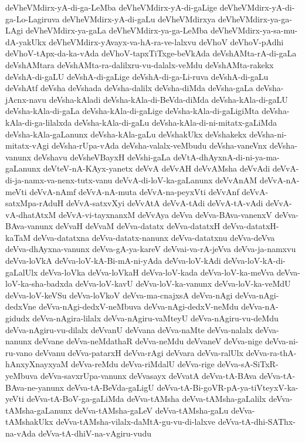 {deVheVMdirx-yA-di-ga-LeMba
deVheVMdirx-yA-di-gaLige
deVheVMdirx-yA-di-ga-Lo-Lagiruva
deVheVMdirx-yA-di-gaLu
deVheVMdirxya
deVheVMdirx-ya-ga-LAgi
deVheVMdirx-ya-gaLa
deVheVMdirx-ya-ga-LeMba
deVheVMdirx-ya-sa-mu-dA-yakUkx
deVheVMdirx-yAvayx-va-hA-ra-ve-lalxvu
deVhoV
deVhoV-pAdhi
deVhoV-tApx-da-ka-vAda
deVhoV-tapxTiTxge-beVkAda
deVshAMta-rA-di-gaLa
deVshAMtara
deVshAMta-ra-dalilxru-vu-dalalx-veMdu
deVshAMta-rakekx
deVshA-di-gaLU
deVshA-di-gaLige
deVshA-di-ga-Li-ruva
deVshA-di-gaLu
deVshAtf
deVsha
deVshada
deVsha-dalilx
deVsha-diMda
deVsha-gaLa
deVsha-jAcnx-navu
deVsha-kAladi
deVsha-kAla-di-BeVda-diMda
deVsha-kAla-di-gaLU
deVsha-kAla-di-gaLa
deVsha-kAla-di-gaLige
deVsha-kAla-di-gaLigiMta
deVsha-kAla-di-ga-lilalxda
deVsha-kAla-di-gaLu
deVsha-kAla-di-ni-mitatx-gaLiMda
deVsha-kAla-gaLanunx
deVsha-kAla-gaLu
deVshakUkx
deVshakekx
deVsha-ni-mitatx-vAgi
deVsha-rUpa-vAda
deVsha-valalx-veMbudu
deVsha-vaneVnx
deVsha-vanunx
deVshavu
deVsheVBayxH
deVshi-gaLa
deVtA-dhAyxnA-di-ni-ya-ma-gaLanunx
deVteV-nA-KAyx-yanetx
deVvA
deVvAH
deVvAMsha
deVvAdi
deVvA-di-ja-namx-va-nenx-tutx-vanu
deVvA-di-loV-ka-gaLanunx
deVvAnAM
deVvA-nA-meVti
deVvA-nAmf
deVvA-nA-muta
deVvA-na-peyxVti
deVvAnf
deVvA-satxMpa-rAduH
deVvA-satxvXyi
deVvAtA
deVvA-tAdi
deVvA-tA-vAdi
deVvA-vA-dhatAtxM
deVvA-vi-tayxnanxM
deVvAya
deVva
deVva-BAva-vanenxV
deVva-BAva-vanunx
deVvaH
deVvaM
deVva-datatx
deVva-datatxH
deVva-datatxH-kaTaM
deVva-datatxna
deVva-datatx-nanunx
deVva-datatxnu
deVva-deVva
deVva-dhAyxna-vanunx
deVva-gA-ya-kareV
deVvai-va-rA-jeVva
deVva-ja-namxvu
deVva-loVkA
deVva-loV-kA-Bi-mA-ni-yAda
deVva-loV-kAdi
deVva-loV-kA-di-gaLalUlx
deVva-loVka
deVva-loVkaH
deVva-loV-kada
deVva-loV-ka-meVva
deVva-loV-ka-sha-badxda
deVva-loV-kavU
deVva-loV-ka-vanunx
deVva-loV-ka-veMdU
deVva-loV-keVSu
deVva-loVkoV
deVva-ma-cnajxsA
deVva-nAgi
deVva-nAgi-dedxVne
deVva-nAgi-dedxV-neMbuva
deVva-nAgi-dedxV-neMdu
deVva-nA-gidudx
deVva-nAgira-lilalx
deVva-nAgiru-vaMteyU
deVva-nAgiru-vu-deMdu
deVva-nAgiru-vu-dilalx
deVvanU
deVvana
deVva-naMte
deVva-nalalx
deVva-nanunx
deVvane
deVva-neMdathaR
deVva-neMdu
deVvaneV
deVva-nige
deVva-ni-ru-vano
deVvanu
deVva-patarxH
deVva-rAgi
deVvara
deVva-ralUlx
deVva-ra-thA-hAnxyXnayxyaM
deVva-reMdu
deVva-riMdalU
deVva-rige
deVva-sA-SiTxR-yeMbuva
deVva-savxrUpa-vanunx
deVvasayx
deVvatA
deVva-tA-BAva
deVva-tA-BAva-ne-yanunx
deVva-tA-BeVda-gaLigU
deVva-tA-Bi-goVR-pA-ya-tiVteyxV-ka-yeVti
deVva-tA-BoV-ga-gaLiMda
deVva-tAMsha
deVva-tAMsha-gaLalilx
deVva-tAMsha-gaLanunx
deVva-tAMsha-gaLeV
deVva-tAMsha-gaLu
deVva-tAMshakUkx
deVva-tAMsha-vilalx-daMtA-gu-vu-di-lalxve
deVva-tA-dhi-SAThx-na-vAda
deVva-tA-dhiV-na-vAgiru-vudu
}
